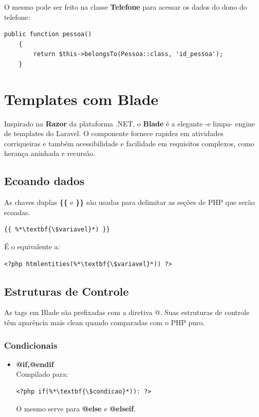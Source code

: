 \documentclass[
12pt,				%
openany,			%
twoside,			%
a4paper,			%
english,			%
french,				%
spanish,			%
brazil,				%
]{abntex2}
\begin{document}
O mesmo pode ser feito na classe \textbf{Telefone} para acessar os dados do dono do telefone:

\begin{lstlisting}[style=php,caption={\textit{app/Telefone.php}}]
    public function pessoa() 
    {
        return $this->belongsTo(Pessoa::class, 'id_pessoa');
    }
\end{lstlisting}

\section{Templates com Blade}

Inspirado na \textbf{Razor} da plataforma .NET, o \textbf{Blade} é a elegante -e limpa- engine de templates
do Laravel. O componente fornece rapidez em atividades corriqueiras e também acessibilidade e facilidade em requisitos complexos, como herança aninhada e recursão.

\subsection{Ecoando dados}

As chaves duplas \textbf{\{\{} e \textbf{\}\}} são usadas para delimitar as seções de PHP que serão ecoadas.

\begin{lstlisting}[style=common,caption={Ecoando uma variável}]
    {{ %*\textbf{\$variavel}*) }}
\end{lstlisting}

É o equivalente a:

\begin{lstlisting}[style=common,caption={Ecoando uma variável em PHP puro}]
    <?php htmlentities(%*\textbf{\$variavel}*)) ?> 
\end{lstlisting}

\subsection{Estruturas de Controle}
As tags em Blade são prefixadas com a diretiva @. Suas estruturas de controle têm aparência mais clean quando comparadas com o PHP puro.

\subsubsection{Condicionais}
\begin{itemize}
    \item \textbf{@if,@endif} \\
        Compilado para:

\begin{lstlisting}[style=common,caption={Correspondente ao @if em PHP puro}]
    <?php if(%*\textbf{\$condicao}*)): ?>
\end{lstlisting}

    O mesmo serve para \textbf{@else} e \textbf{@elseif}.
\end{itemize}
\end{document}
